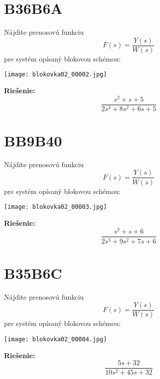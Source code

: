 \documentclass[a4paper, 12pt]{article}
\newenvironment{task}{}{}
\newenvironment{solution}{\noindent\textbf{Riešenie:}}{}
\begin{document}
\section*{B36B6A}
\begin{task}
    Nájdite prenosovú funkciu 
    \begin{equation*}
        F(s)=\dfrac{Y(s)}{W(s)}
    \end{equation*}
     pre systém opísaný blokovou schémou: 

    \texttt{[image: blokovka02\_00002.jpg]} 
\end{task} 

\begin{solution}
    \begin{equation*}
        \dfrac{s^2+s+5}{2s^3+8s^2+6s+5}
    \end{equation*}
\end{solution}

\section*{BB9B40}
\begin{task}
    Nájdite prenosovú funkciu 
    \begin{equation*}
        F(s)=\dfrac{Y(s)}{W(s)}
    \end{equation*}
     pre systém opísaný blokovou schémou: 

    \texttt{[image: blokovka02\_00003.jpg]} 
\end{task} 

\begin{solution}
    \begin{equation*}
        \dfrac{s^2+s+6}{2s^3+9s^2+7s+6}
    \end{equation*}
\end{solution}
\section*{B35B6C}
\begin{task}
    Nájdite prenosovú funkciu 
    \begin{equation*}
        F(s)=\dfrac{Y(s)}{W(s)}
    \end{equation*}
     pre systém opísaný blokovou schémou: 

    \texttt{[image: blokovka02\_00004.jpg]} 
\end{task} 

\begin{solution}
    \begin{equation*}
        \dfrac{5s+32}{10s^2+45s+32}
    \end{equation*}
\end{solution}
\end{document}
